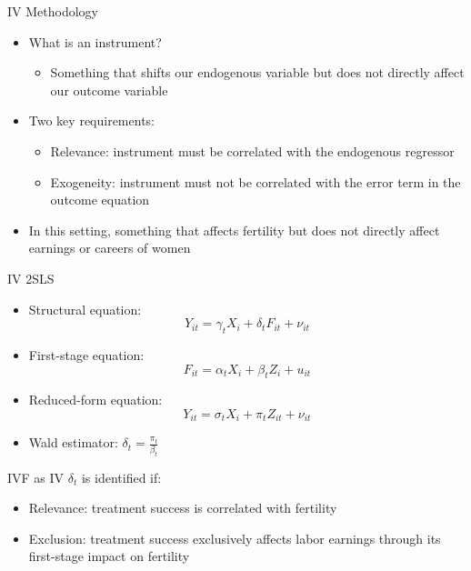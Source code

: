 \documentclass[11pt,notes=hide,aspectratio=169,mathserif]{beamer}
\begin{document}
\begin{frame}{IV Methodology}
\begin{itemize}
  \item What is an instrument? 
  \begin{itemize}
    \item Something that shifts our endogenous variable but does not directly affect our outcome variable
  \end{itemize}
  \item Two key requirements:
  \begin{itemize}
    \item Relevance: instrument must be correlated with the endogenous regressor
    \item Exogeneity: instrument must not be correlated with the error term in the outcome equation
    \end{itemize}
  \item In this setting, something that affects fertility but does not directly affect earnings or careers of women 
\end{itemize}
\end{frame}

\begin{frame}{IV 2SLS}
\begin{itemize}
  \item Structural equation:
  \[
Y_{it} = \gamma_t X_i + \delta_t F_{it} + \nu_{it}
\]
  \item First-stage equation:
  \[
F_{it} =\alpha_t X_i + \beta_t Z_i + u_{it}
\]
\item Reduced-form equation:
\[
Y_{it} = \sigma_t X_i + \pi_t Z_{it} + \nu_{it}
\]
\item Wald estimator: \(\delta_t = \frac{\pi_t}{\beta_t}\)
\end{itemize}
\end{frame}

\begin{frame}{IVF as IV}
  $\delta_t$ is identified if:
\begin{itemize}
  \item Relevance: treatment success is correlated with fertility 
  \item Exclusion: treatment success exclusively affects labor earnings through its first-stage impact on fertility
\end{itemize}
\end{frame}
\end{document}
